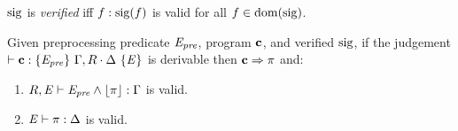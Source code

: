\begin{definition}
  $\mathrm{sig}$ is \emph{verified} iff $f : \mathrm{sig}(f)$ is valid for all $f \in \mathrm{dom}(\mathrm{sig})$.
\end{definition}

\begin{theorem}
  Given preprocessing predicate $\mathit{E}_{\mathit{pre}}$, program $\mathbf{c}$, and verified $\mathrm{sig}$, if
  the judgement $\vdash \mathbf{c} : \{ \mathit{E}_{\mathit{pre}} \}\ \Gamma,R \cdot \Delta\ \{ \mathit{E} \}$ is derivable then
  $\mathbf{c} \Rightarrow \pi$ and:
  \begin{enumerate}
  \item $R,\mathit{E} \vdash \mathit{E}_{\mathit{pre}} \wedge \lfloor \pi \rfloor : \Gamma$ is valid.
  \item $\mathit{E} \vdash \pi : \Delta$ is valid.
  \end{enumerate}
\end{theorem}
